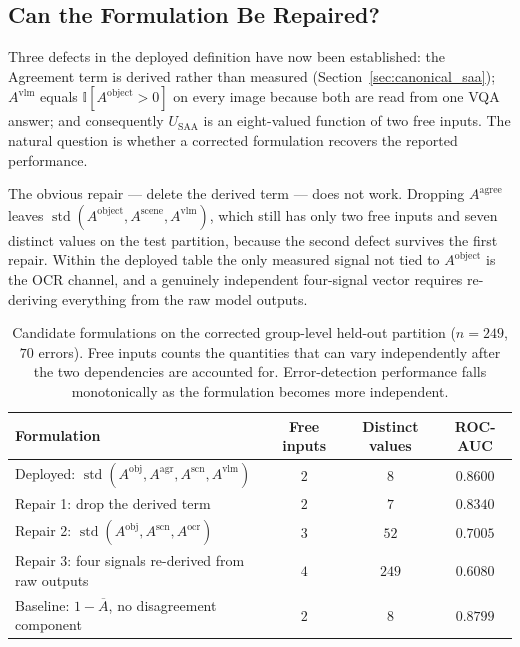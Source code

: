 \documentclass[12pt,a4paper]{report}
\begin{document}
\subsection{Can the Formulation Be Repaired?}
\label{sec:formulation_repair}

Three defects in the deployed definition have now been established: the Agreement term is
derived rather than measured (Section~\ref{sec:canonical_saa}); $A^{\text{vlm}}$ equals
$\mathbb{I}[A^{\text{object}}>0]$ on every image because both are read from one VQA answer; and
consequently $U_{\text{SAA}}$ is an eight-valued function of two free inputs. The natural
question is whether a corrected formulation recovers the reported performance.

The obvious repair --- delete the derived term --- does not work. Dropping $A^{\text{agree}}$
leaves $\operatorname{std}(A^{\text{object}}, A^{\text{scene}}, A^{\text{vlm}})$, which still has
only two free inputs and seven distinct values on the test partition, because the second defect
survives the first repair. Within the deployed table the only measured signal not tied to
$A^{\text{object}}$ is the OCR channel, and a genuinely independent four-signal vector requires
re-deriving everything from the raw model outputs.

\begin{table}[!htbp]
\centering
\caption[Candidate formulations on the corrected group-level held-out partition ($n=249$, $70$ errors)]{Candidate formulations on the corrected group-level held-out partition ($n=249$, $70$ errors). Free inputs counts the quantities that can vary independently after the two dependencies are accounted for. Error-detection performance falls monotonically as the formulation becomes more independent.}
\label{tab:formulation_repair}
\small
\begin{tabular}{@{}p{6.2cm} c c c@{}}
\toprule
\textbf{Formulation} & \textbf{Free inputs} & \textbf{Distinct values} & \textbf{ROC-AUC} \\
\midrule
Deployed: $\operatorname{std}(A^{\text{obj}}, A^{\text{agr}}, A^{\text{scn}}, A^{\text{vlm}})$ & $2$ & $8$ & $\mathbf{0.8600}$ \\
Repair 1: drop the derived term & $2$ & $7$ & $0.8340$ \\
Repair 2: $\operatorname{std}(A^{\text{obj}}, A^{\text{scn}}, A^{\text{ocr}})$ & $3$ & $52$ & $0.7005$ \\
Repair 3: four signals re-derived from raw outputs & $4$ & $249$ & $0.6080$ \\
\addlinespace
Baseline: $1-\overline{A}$, no disagreement component & $2$ & $8$ & $0.8799$ \\
\bottomrule
\end{tabular}
\end{table}
\end{document}
